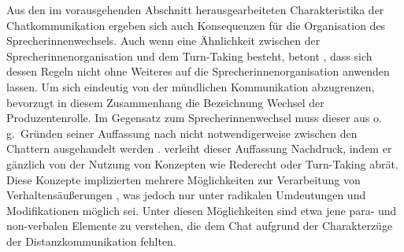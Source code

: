 Aus den im vorausgehenden Abschnitt herausgearbeiteten Charakteristika der Chatkommunikation ergeben sich auch Konsequenzen für die Organisation des Sprecher{\textperiodcentered}\linebreak[3]innenwechsels. Auch wenn eine Ähnlichkeit zwischen der Sprecher{\textperiodcentered}\linebreak[3]innen\-or\-ga\-nisation und dem Turn-Taking besteht, betont \citet[453]{storrer_getippte_2001}, dass sich dessen Regeln nicht ohne Weiteres auf die Sprecher{\textperiodcentered}innenorganisation anwenden lassen. Um sich eindeutig von der mündlichen Kommunikation abzugrenzen, bevorzugt \citet[146]{beiswenger_eyetracking_2017} in diesem Zusammenhang die Bezeichnung \glqq Wechsel der Produzentenrolle\grqq{}. Im Gegensatz zum Sprecher{\textperiodcentered}innenwechsel muss dieser aus o.\,g.\ Gründen seiner Auffassung nach \glqq nicht notwendigerweise zwischen den Chattern ausgehandelt werden\grqq{} \citep[146]{beiswenger_eyetracking_2017}. \citet[117]{beiswenger_sprachhandlungskoordination_2007} verleiht dieser Auffassung Nachdruck, indem er gänzlich von der Nutzung von Konzepten wie Rederecht oder Turn-Taking abrät. Diese Konzepte implizierten mehrere \glqq Möglichkeiten zur Verarbeitung von Verhaltensäußerungen\grqq{} \citep[117]{beiswenger_sprachhandlungskoordination_2007}, was jedoch \glqq nur unter radikalen Umdeutungen und Modifikationen möglich\grqq{} \citep[117]{beiswenger_sprachhandlungskoordination_2007} sei. Unter diesen Möglichkeiten sind etwa jene para- und non-verbalen Elemente zu verstehen, die dem Chat aufgrund der Charakterzüge der Distanzkommunikation fehlten.

